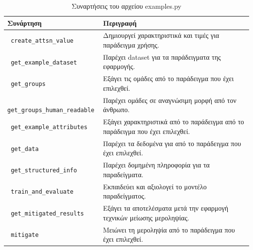 \documentclass[12pt,twoside]{article}
\newcommand{\en}{\selectlanguage{english}}
\newcommand{\gr}{\selectlanguage{greek}}
\begin{document}
\begin{table}[H]
\centering
\caption{\gr Συναρτήσεις του αρχείου \en examples.py}
\begin{tabular}{|l|p{10cm}|}
\hline
\textbf{\gr Συνάρτηση} & \textbf{\gr Περιγραφή} \\ \hline
\texttt{ \en create\_attsn\_value} & \gr Δημιουργεί χαρακτηριστικά και τιμές για παράδειγμα χρήσης. \\ \hline
\texttt{ \en get\_example\_dataset} & \gr Παρέχει \en dataset \gr για τα παράδειγματα της εφαρμογής. \\ \hline
\texttt{ \en get\_groups} & \gr Εξάγει τις ομάδες από το παράδειγμα που έχει επιλεχθεί. \\ \hline
\texttt{ \en get\_groups\_human\_readable} & \gr Παρέχει ομάδες σε αναγνώσιμη μορφή από τον άνθρωπο. \\ \hline
\texttt{ \en get\_example\_attributes} & \gr Εξάγει χαρακτηριστικά από το παράδειγμα από το παράδειγμα που έχει επιλεχθεί. \\ \hline
\texttt{ \en get\_data} & \gr Παρέχει τα δεδομένα για από το παράδειγμα που έχει επιλεχθεί. \\ \hline
\texttt{ \en get\_structured\_info} & \gr Παρέχει δομημένη πληροφορία για τα παραδείγματα. \\ \hline
\texttt{ \en train\_and\_evaluate} & \gr Εκπαιδεύει και αξιολογεί το μοντέλο παραδείγματος. \\ \hline
\texttt{ \en get\_mitigated\_results} & \gr Εξάγει τα αποτελέσματα μετά την εφαρμογή τεχνικών μείωσης μεροληψίας. \\ \hline
\texttt{ \en mitigate} & \gr Μειώνει τη μεροληψία από το παράδειγμα που έχει επιλεχθεί. \\ \hline
\end{tabular}
\end{table}
\end{document}
